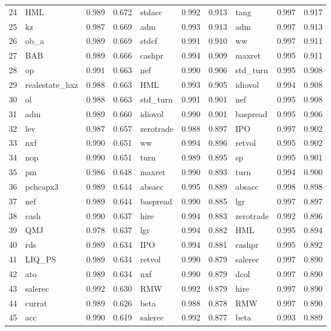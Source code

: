 \begin{landscape}
\begin{footnotesize}
\begin{longtable}{l|lcc|lcc|lcc}
  24 & HML & 0.989 & 0.672 & stdacc & 0.992 & 0.913 & tang & 0.997 & 0.917 \\ 
  25 & kz & 0.987 & 0.669 & adm & 0.993 & 0.913 & adm & 0.997 & 0.913 \\ 
  26 & ob\_a & 0.989 & 0.669 & stdcf & 0.991 & 0.910 & ww & 0.997 & 0.911 \\ 
  27 & BAB & 0.989 & 0.666 & cashpr & 0.994 & 0.909 & maxret & 0.995 & 0.911 \\ 
  28 & op & 0.991 & 0.663 & nef & 0.990 & 0.906 & std\_turn & 0.995 & 0.908 \\ 
  29 & realestate\_hxz & 0.988 & 0.663 & HML & 0.993 & 0.905 & idiovol & 0.994 & 0.908 \\ 
  30 & ol & 0.988 & 0.663 & std\_turn & 0.991 & 0.901 & nef & 0.995 & 0.908 \\ 
  31 & adm & 0.989 & 0.660 & idiovol & 0.990 & 0.901 & baspread & 0.995 & 0.906 \\ 
  32 & lev & 0.987 & 0.657 & zerotrade & 0.988 & 0.897 & IPO & 0.997 & 0.902 \\ 
  33 & nxf & 0.990 & 0.651 & ww & 0.994 & 0.896 & retvol & 0.995 & 0.902 \\ 
  34 & nop & 0.990 & 0.651 & turn & 0.989 & 0.895 & sp & 0.995 & 0.901 \\ 
  35 & pm & 0.986 & 0.648 & maxret & 0.990 & 0.893 & turn & 0.994 & 0.900 \\ 
  36 & pchcapx3 & 0.989 & 0.644 & absacc & 0.995 & 0.889 & absacc & 0.998 & 0.898 \\ 
  37 & nef & 0.989 & 0.644 & baspread & 0.990 & 0.885 & lgr & 0.997 & 0.897 \\ 
  38 & cash & 0.990 & 0.637 & hire & 0.994 & 0.883 & zerotrade & 0.992 & 0.896 \\ 
  39 & QMJ & 0.978 & 0.637 & lgr & 0.994 & 0.882 & HML & 0.995 & 0.894 \\ 
  40 & rds & 0.989 & 0.634 & IPO & 0.994 & 0.881 & cashpr & 0.995 & 0.892 \\ 
  41 & LIQ\_PS & 0.989 & 0.634 & retvol & 0.990 & 0.879 & salerec & 0.997 & 0.890 \\ 
  42 & ato & 0.989 & 0.634 & nxf & 0.990 & 0.879 & dcol & 0.997 & 0.890 \\ 
  43 & salerec & 0.992 & 0.630 & RMW & 0.992 & 0.879 & hire & 0.997 & 0.890 \\ 
  44 & currat & 0.989 & 0.626 & beta & 0.988 & 0.878 & RMW & 0.997 & 0.890 \\ 
  45 & acc & 0.990 & 0.619 & salerec & 0.992 & 0.877 & beta & 0.993 & 0.889 \\ 

\end{longtable}
\end{footnotesize}
\end{landscape}
